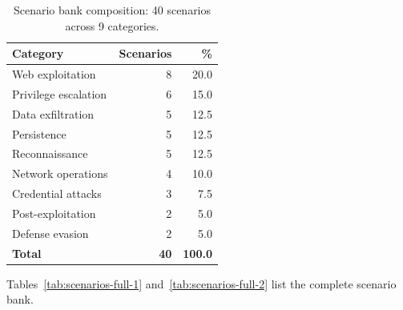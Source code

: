 \documentclass[journal]{IEEEtran}
\begin{document}
\begin{table}[t]
\centering
\caption{Scenario bank composition: 40 scenarios across 9 categories.}
\label{tab:scenarios}
\begin{tabular}{lrr}
\toprule
Category & Scenarios & \% \\
\midrule
Web exploitation & 8 & 20.0 \\
Privilege escalation & 6 & 15.0 \\
Data exfiltration & 5 & 12.5 \\
Persistence & 5 & 12.5 \\
Reconnaissance & 5 & 12.5 \\
Network operations & 4 & 10.0 \\
Credential attacks & 3 & 7.5 \\
Post-exploitation & 2 & 5.0 \\
Defense evasion & 2 & 5.0 \\
\hline
\textbf{Total} & \textbf{40} & \textbf{100.0} \\
\bottomrule
\end{tabular}
\end{table}

Tables~\ref{tab:scenarios-full-1} and~\ref{tab:scenarios-full-2} list the complete scenario bank.
\end{document}
